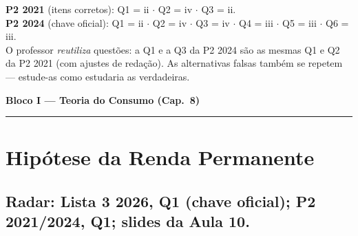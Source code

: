 \documentclass[12pt, a4paper]{article}
\begin{document}
\begin{resultbox}[title={Gabaritos oficiais das provas anteriores (para referência)}]
\textbf{P2 2021} (itens corretos): Q1 = ii $\cdot$ Q2 = iv $\cdot$ Q3 = ii.\\
\textbf{P2 2024} (chave oficial): Q1 = ii $\cdot$ Q2 = iv $\cdot$ Q3 = iv $\cdot$
Q4 = iii $\cdot$ Q5 = iii $\cdot$ Q6 = iii.\\[0.3em]
O professor \emph{reutiliza} questões: a Q1 e a Q3 da P2 2024 são as mesmas
Q1 e Q2 da P2 2021 (com ajustes de redação). As alternativas falsas também se
repetem --- estude-as como estudaria as verdadeiras.
\end{resultbox}

\newpage
\begin{center}
{\large\bfseries\color{cyanrbc} Bloco I --- Teoria do Consumo (Cap.\ 8)}\\[0.2em]
\rule{\linewidth}{0.6pt}
\end{center}

\setcounter{section}{0}

\section{Hipótese da Renda Permanente}

\subsection{Radar: Lista 3 2026, Q1 (chave oficial); P2 2021/2024, Q1; slides da Aula 10.}
\end{document}
